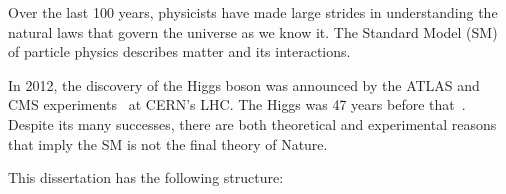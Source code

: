 

\label{sec:introduction}

Over the last 100 years, physicists have made large strides in understanding the natural laws that govern the universe as we know it. The Standard Model (SM) of particle physics describes matter and its interactions.

In 2012, the discovery of the Higgs boson was announced by the ATLAS and CMS experiments~\cite{Higgs_discovery_2012_CMS,Higgs_discovery_2012_ATLAS,Higgs_discovery_2013_CMS} at CERN's LHC.
The Higgs was 47 years before that~\cite{Higgs_theory1,Higgs_theory2}.
Despite its many successes, there are both theoretical and experimental reasons that imply the SM is not the final theory of Nature.

This dissertation has the following structure: